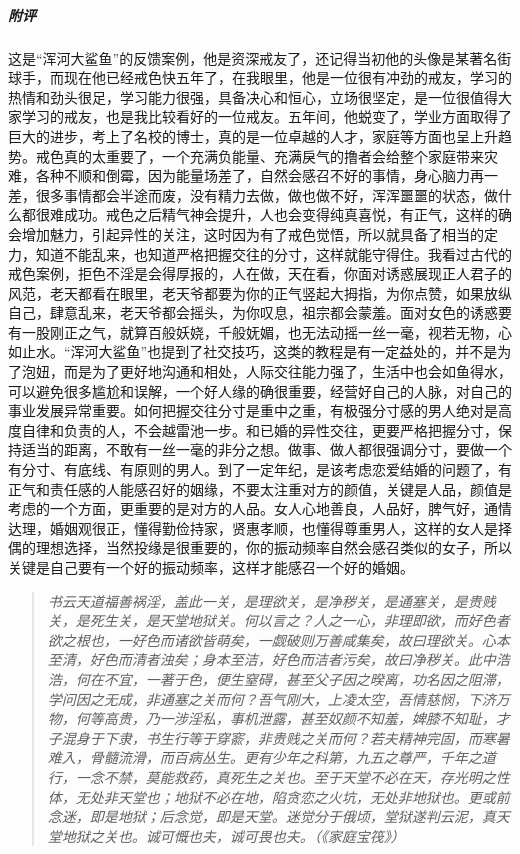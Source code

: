 \begin{case}
    \subparagraph{附评} 这是“浑河大鲨鱼”的反馈案例，他是资深戒友了，还记得当初他的头像是某著名街球手，而现在他已经戒色快五年了，在我眼里，他是一位很有冲劲的戒友，学习的热情和劲头很足，学习能力很强，具备决心和恒心，立场很坚定，是一位很值得大家学习的戒友，也是我比较看好的一位戒友。五年间，他蜕变了，学业方面取得了巨大的进步，考上了名校的博士，真的是一位卓越的人才，家庭等方面也呈上升趋势。戒色真的太重要了，一个充满负能量、充满戾气的撸者会给整个家庭带来灾难，各种不顺和倒霉，因为能量场差了，自然会感召不好的事情，身心脑力再一差，很多事情都会半途而废，没有精力去做，做也做不好，浑浑噩噩的状态，做什么都很难成功。戒色之后精气神会提升，人也会变得纯真喜悦，有正气，这样的确会增加魅力，引起异性的关注，这时因为有了戒色觉悟，所以就具备了相当的定力，知道不能乱来，也知道严格把握交往的分寸，这样就能守得住。我看过古代的戒色案例，拒色不淫是会得厚报的，人在做，天在看，你面对诱惑展现正人君子的风范，老天都看在眼里，老天爷都要为你的正气竖起大拇指，为你点赞，如果放纵自己，肆意乱来，老天爷都会摇头，为你叹息，祖宗都会蒙羞。面对女色的诱惑要有一股刚正之气，就算百般妖娆，千般妩媚，也无法动摇一丝一毫，视若无物，心如止水。“浑河大鲨鱼”也提到了社交技巧，这类的教程是有一定益处的，并不是为了泡妞，而是为了更好地沟通和相处，人际交往能力强了，生活中也会如鱼得水，可以避免很多尴尬和误解，一个好人缘的确很重要，经营好自己的人脉，对自己的事业发展异常重要。如何把握交往分寸是重中之重，有极强分寸感的男人绝对是高度自律和负责的人，不会越雷池一步。和已婚的异性交往，更要严格把握分寸，保持适当的距离，不敢有一丝一毫的非分之想。做事、做人都很强调分寸，要做一个有分寸、有底线、有原则的男人。到了一定年纪，是该考虑恋爱结婚的问题了，有正气和责任感的人能感召好的姻缘，不要太注重对方的颜值，关键是人品，颜值是考虑的一个方面，更重要的是对方的人品。女人心地善良，人品好，脾气好，通情达理，婚姻观很正，懂得勤俭持家，贤惠孝顺，也懂得尊重男人，这样的女人是择偶的理想选择，当然投缘是很重要的，你的振动频率自然会感召类似的女子，所以关键是自己要有一个好的振动频率，这样才能感召一个好的婚姻。

    \begin{quote}\it
        书云天道福善祸淫，盖此一关，是理欲关，是净秽关，是通塞关，是贵贱关，是死生关，是天堂地狱关。何以言之？人之一心，非理即欲，而好色者欲之根也，一好色而诸欲皆萌矣，一觑破则万善咸集矣，故曰理欲关。心本至清，好色而清者浊矣；身本至洁，好色而洁者污矣，故曰净秽关。此中浩浩，何在不宜，一著于色，便生窒碍，甚至父子因之暌离，功名因之阻滞，学问因之无成，非通塞之关而何？吾气刚大，上凌太空，吾情慈悯，下济万物，何等高贵，乃一涉淫私，事机泄露，甚至奴颜不知羞，婢膝不知耻，才子混身于下隶，书生行等于穿窬，非贵贱之关而何？若夫精神完固，而寒暑难入，骨髓流滑，而百病丛生。更有少年之科第，九五之尊严，千年之道行，一念不禁，莫能救药，真死生之关也。至于天堂不必在天，存光明之性体，无处非天堂也；地狱不必在地，陷贪恋之火坑，无处非地狱也。更或前念迷，即是地狱；后念觉，即是天堂。迷觉分于俄顷，堂狱遂判云泥，真天堂地狱之关也。诚可慨也夫，诚可畏也夫。（《家庭宝筏》）
    \end{quote}


\end{case}
